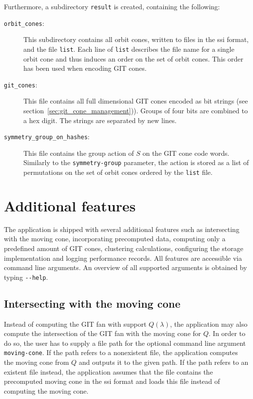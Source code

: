 Furthermore, a subdirectory \texttt{result} is created, containing the following:

\begin{description}
	\item[\texttt{orbit\_cones}:] This subdirectory contains all orbit cones, written to files in the \ac{ssi} format, and the file \texttt{list}. Each line of \texttt{list} describes the file name for a single orbit cone and thus induces an order on the set of orbit cones. This order has been used when encoding GIT cones.
	\item[\texttt{git\_cones}:] This file contains all full dimensional GIT cones encoded as bit strings (see section~\ref{sec:git_cone_management})). Groups of four bits are combined to a hex digit. The strings are separated by new lines.
	\item[\texttt{symmetry\_group\_on\_hashes}:] This file contains the group action of $S$ on the GIT cone code words. Similarly to the \texttt{symmetry-group} parameter, the action is stored as a list of permutations on the set of orbit cones ordered by the \texttt{list} file.
\end{description}

\section{Additional features}
\label{sec:additional_features}

The application is shipped with several additional features such as intersecting with the moving cone, incorporating precomputed data, computing only a predefined amount of GIT cones, clustering calculations, configuring the storage implementation and logging performance records. All features are accessible via command line arguments. An overview of all supported arguments is obtained by typing \texttt{-{}-help}.

\subsection*{Intersecting with the moving cone}

Instead of computing the GIT fan with support $Q(\lambda)$, the application may also compute the intersection of the GIT fan with the moving cone for $Q$. In order to do so, the user has to supply a file path for the optional command line argument \texttt{moving-cone}. If the path refers to a nonexistent file, the application computes the moving cone from $Q$ and outputs it to the given path. If the path refers to an existent file instead, the application assumes that the file contains the precomputed moving cone in the \ac{ssi} format and loads this file instead of computing the moving cone.

